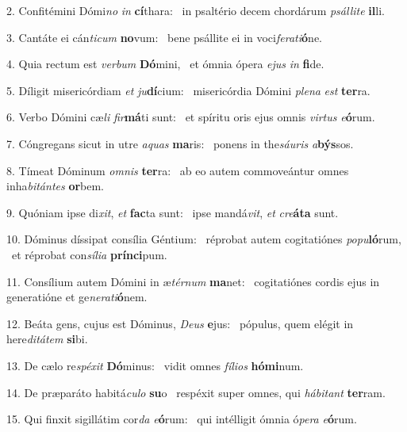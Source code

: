 2. Confitémini Dómi\textit{no} \textit{in} \textbf{cí}thara: \ast\  in psaltério decem chordárum \textit{psál}\textit{li}\textit{te} \textbf{il}li.\

3. Cantáte ei cán\textit{ti}\textit{cum} \textbf{no}vum: \ast\  bene psállite ei in voci\textit{fe}\textit{ra}\textit{ti}\textbf{ó}ne.\

4. Quia rectum est \textit{ver}\textit{bum} \textbf{Dó}mini, \ast\  et ómnia ópera \textit{e}\textit{jus} \textit{in} \textbf{fi}de.\

5. Díligit misericórdiam \textit{et} \textit{ju}\textbf{dí}cium: \ast\  misericórdia Dómini \textit{ple}\textit{na} \textit{est} \textbf{ter}ra.\

6. Verbo Dómini cæ\textit{li} \textit{fir}\textbf{má}ti sunt: \ast\  et spíritu oris ejus omnis \textit{vir}\textit{tus} \textit{e}\textbf{ó}rum.\

7. Cóngregans sicut in utre \textit{a}\textit{quas} \textbf{ma}ris: \ast\  ponens in the\textit{sáu}\textit{ris} \textit{a}\textbf{býs}sos.\

8. Tímeat Dóminum \textit{om}\textit{nis} \textbf{ter}ra: \ast\  ab eo autem commoveántur omnes inha\textit{bi}\textit{tán}\textit{tes} \textbf{or}bem.\

9. Quóniam ipse di\textit{xit}, \textit{et} \textbf{fac}ta sunt: \ast\  ipse mandá\textit{vit}, \textit{et} \textit{cre}\textbf{á}\textbf{ta} sunt.\

10. Dóminus díssipat consília Géntium: \dag\  réprobat autem cogitatiónes \textit{po}\textit{pu}\textbf{ló}rum, \ast\  et réprobat con\textit{sí}\textit{li}\textit{a} \textbf{prín}\textbf{ci}pum.\

11. Consílium autem Dómini in æ\textit{tér}\textit{num} \textbf{ma}net: \ast\  cogitatiónes cordis ejus in generatióne et ge\textit{ne}\textit{ra}\textit{ti}\textbf{ó}nem.\

12. Beáta gens, cujus est Dóminus, \textit{De}\textit{us} \textbf{e}jus: \ast\  pópulus, quem elégit in here\textit{di}\textit{tá}\textit{tem} \textbf{si}bi.\

13. De cælo re\textit{spé}\textit{xit} \textbf{Dó}minus: \ast\  vidit omnes \textit{fí}\textit{li}\textit{os} \textbf{hó}\textbf{mi}num.\

14. De præparáto habitá\textit{cu}\textit{lo} \textbf{su}o \ast\  respéxit super omnes, qui \textit{há}\textit{bi}\textit{tant} \textbf{ter}ram.\

15. Qui finxit sigillátim cor\textit{da} \textit{e}\textbf{ó}rum: \ast\  qui intélligit ómnia ó\textit{pe}\textit{ra} \textit{e}\textbf{ó}rum.\

